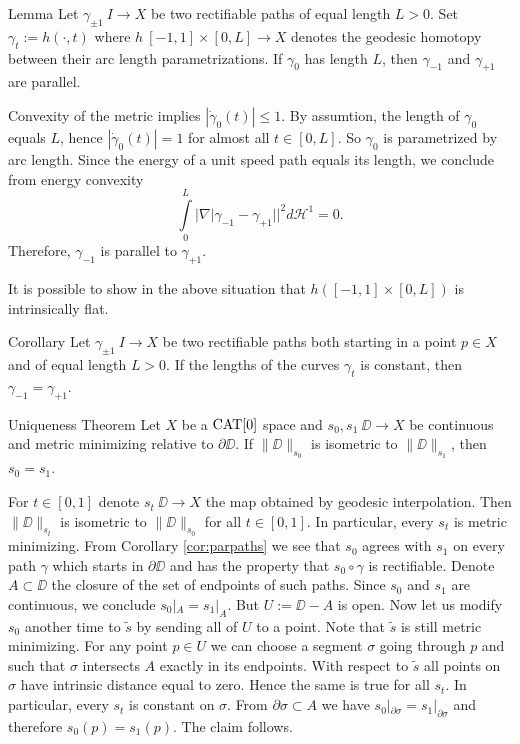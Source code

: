\documentclass[a4paper,10pt]{amsart}
\begin{document}
\begin{thm}{Lemma}\label{lem:parpaths}
Let $\gamma_{\pm 1}\:I\to X$ be two rectifiable paths of equal length $L>0$. Set $\gamma_t:=h(\cdot,t)$ where $h\:[-1,1]\times[0,L]\to X$ denotes the geodesic homotopy
between their arc length parametrizations. If $\gamma_0$ has length $L$, then $\gamma_{-1}$ and $\gamma_{+1}$ are parallel. 
\end{thm}
Convexity of the metric implies $|\dot\gamma_0(t)|\leq 1$. By assumtion, the length of $\gamma_0$ equals $L$, hence $|\dot\gamma_0(t)|=1$ for almost all $t\in[0,L]$. So $\gamma_0$
is parametrized by arc length. Since the energy of a unit speed path equals its length, we conclude from energy convexity 
$$
\int\limits_0^L|\nabla |\gamma_{-1}-\gamma_{+1}||^2 d\mathcal{H}^1
=
0.
$$
Therefore, $\gamma_{-1}$ is parallel to $\gamma_{+1}$.
\qeds

It is possible to show in the above situation that  $h([-1,1]\times[0,L])$ is intrinsically flat.

\begin{thm}{Corollary}\label{cor:parpaths}
Let $\gamma_{\pm 1}\:I\to X$ be two rectifiable paths both starting in a point $p\in X$ and of equal length $L>0$. 
If the lengths of the curves $\gamma_t$ is constant, then $\gamma_{-1}=\gamma_{+1}$.
\end{thm}

\begin{thm}{Uniqueness Theorem}\label{prop:strict-mm}
Let $X$ be a $\mathop{\rm CAT}\nolimits[0]$ space and $s_0, s_1\:\DD\to X$ be continuous and metric minimizing relative to $\partial\DD$. If 
$\|\DD\|_{s_0}$ is isometric to $\|\DD\|_{s_1}$, then $s_0=s_1$.
\end{thm}

For $t\in[0,1]$ denote $s_t\:\DD\to X$ the map obtained by geodesic interpolation. Then
$\|\DD\|_{s_t}$ is isometric to $\|\DD\|_{s_0}$ for all $t\in[0,1]$. In particular, every $s_t$ is metric minimizing.
From Corollary \ref{cor:parpaths} we see that $s_0$ agrees with $s_1$ on every path $\gamma$ which starts
in $\partial\DD$ and has the property that $s_0\circ\gamma$ is rectifiable. Denote $A\subset\DD$ the closure of
the set of endpoints of such paths. Since $s_0$ and $s_1$ are continuous, we conclude $s_0|_{A}=s_1|_{A}$.
But $U:=\DD-A$ is open. Now let us modify $s_0$ another time to $\tilde s$ by sending all of $U$ to a point. Note that $\tilde s$
is still metric minimizing. 
For any point $p\in U$ we can choose a segment $\sigma$ going through $p$ and such that $\sigma$ intersects $A$ exactly in its endpoints. 
With respect to $\tilde s$ all points on $\sigma$ have intrinsic distance equal to zero.  Hence the same is true for all $s_t$. 
In particular, every $s_t$ is constant on $\sigma$. From $\partial \sigma\subset A$ we have  $s_0|_{\partial\sigma}=s_1|_{\partial\sigma}$
and therefore $s_0(p)=s_1(p)$. The claim follows.
\qeds
\end{document}
